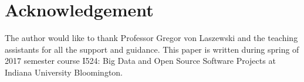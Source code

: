 \documentclass[9pt,twocolumn,twoside]{../../styles/osajnl}
\begin{document}
\section{Acknowledgement}
The author would like to thank Professor Gregor von Laszewski and the
teaching assistants for all the support and guidance. This paper is written during spring of 2017
semester course {I524: Big Data and Open Source Software Projects} at
Indiana University Bloomington.


\end{document}
